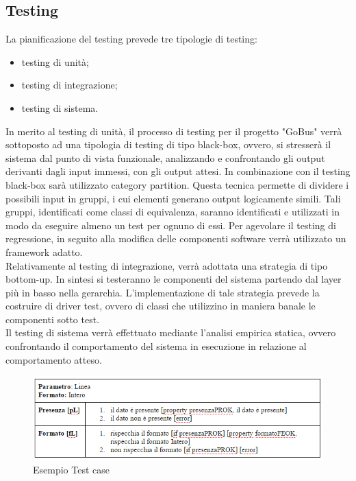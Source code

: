 \subsection{Testing}
La pianificazione del testing prevede tre tipologie di testing:
\begin{itemize}
\item testing di unit\`{a};
\item testing di integrazione;
\item testing di sistema.
\end{itemize}
In merito al testing di unit\`{a}, il processo di testing per il progetto "GoBus" verr\`{a} sottoposto ad una tipologia di testing di tipo black-box, ovvero, si stresser\`{a} il sistema dal punto di vista funzionale, analizzando e confrontando gli output derivanti dagli input immessi, con gli output attesi. In combinazione con il testing black-box sar\`{a} utilizzato category partition. Questa tecnica permette di dividere i possibili input in gruppi, i cui elementi generano output logicamente simili. Tali gruppi, identificati come classi di equivalenza, saranno identificati e utilizzati in modo da eseguire almeno un test per ognuno di essi. Per agevolare il testing di regressione, in seguito alla modifica delle componenti software verr\`{a} utilizzato un framework adatto.\\
Relativamente al testing di integrazione, verr\`{a} adottata una strategia di tipo bottom-up. In sintesi si testeranno le componenti del sistema partendo dal layer pi\`{u} in basso nella gerarchia. L\rq implementazione di tale strategia prevede la costruire di driver test, ovvero di classi che utilizzino in maniera banale le componenti sotto test.\\
Il testing di sistema verr\`{a} effettuato mediante l\rq analisi empirica statica, ovvero confrontando il comportamento del sistema in esecuzione in relazione al comportamento atteso.\\

\begin{figure}[h]
\centering
\includegraphics[scale=.5]{img/21.png}
\caption{Esempio Test case }
\label{fig:mhs}
\end{figure}  

